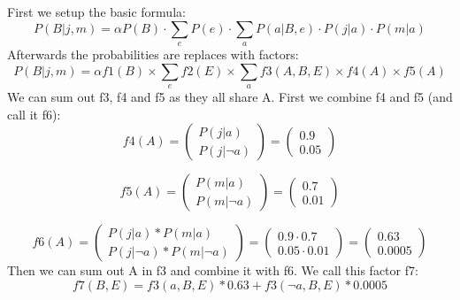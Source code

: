 \documentclass[11pt]{article}
\begin{document}
First we setup the basic formula:
$$P(B|j,m) = \alpha P(B) \cdot \sum_{e}P(e) \cdot \sum_{a}P(a|B,e) \cdot P(j|a) \cdot P(m|a)$$
Afterwards the probabilities are replaces with factors:
$$P(B|j,m) = \alpha f1(B) \times \sum_{e}f2(E) \times \sum_{a}f3(A,B,E) \times f4(A) \times f5(A)$$
We can sum out f3, f4 and f5 as they all share A. First we combine f4 and f5 (and call it f6):
$$ f4(A) = 
\begin{pmatrix}
  P(j|a) \\
  P(j|\neg a)
\end{pmatrix}
 = 
\begin{pmatrix}
  0.9 \\
  0.05
\end{pmatrix}
$$ 
 
$$ f5(A) = 
\begin{pmatrix}
  P(m|a) \\
  P(m|\neg a)
\end{pmatrix}
 = 
\begin{pmatrix}
  0.7 \\
  0.01
\end{pmatrix}
$$ 

$$ f6(A) = 
\begin{pmatrix}
  P(j|a)*P(m|a) \\
  P(j|\neg a)*P(m|\neg a)
\end{pmatrix}
 = 
\begin{pmatrix}
  0.9 \cdot 0.7 \\
  0.05 \cdot 0.01
\end{pmatrix}
 = 
\begin{pmatrix}
  0.63 \\
  0.0005
\end{pmatrix}
$$ 
Then we can sum out A in f3 and combine it with f6. We call this factor f7:
$$
  f7(B,E) = f3(a,B,E) * 0.63 + f3(\neg a,B,E) * 0.0005
$$
\end{document}
